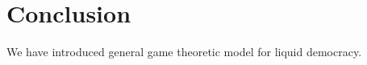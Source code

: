 \section{Conclusion}
We have introduced general game theoretic model for liquid democracy.  








